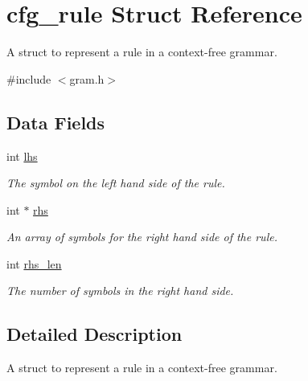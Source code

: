 \hypertarget{structcfg__rule}{\section{cfg\-\_\-rule \-Struct \-Reference}
\label{structcfg__rule}
}


\-A struct to represent a rule in a context-\/free grammar.  




{\ttfamily \#include $<$gram.\-h$>$}

\subsection*{\-Data \-Fields}
\begin{DoxyCompactItemize}
\item 
\hypertarget{structcfg__rule_ad79dfb552ae253049535ec9313589411}{int \hyperlink{structcfg__rule_ad79dfb552ae253049535ec9313589411}{lhs}}\label{structcfg__rule_ad79dfb552ae253049535ec9313589411}

\begin{DoxyCompactList}\small\item\em \-The symbol on the left hand side of the rule. \end{DoxyCompactList}\item 
\hypertarget{structcfg__rule_aa5629183aa50f5a8cb0aaa8896b7e37c}{int $\ast$ \hyperlink{structcfg__rule_aa5629183aa50f5a8cb0aaa8896b7e37c}{rhs}}\label{structcfg__rule_aa5629183aa50f5a8cb0aaa8896b7e37c}

\begin{DoxyCompactList}\small\item\em \-An array of symbols for the right hand side of the rule. \end{DoxyCompactList}\item 
\hypertarget{structcfg__rule_a9c44d66a9b3bbe2357e78def1286d000}{int \hyperlink{structcfg__rule_a9c44d66a9b3bbe2357e78def1286d000}{rhs\-\_\-len}}\label{structcfg__rule_a9c44d66a9b3bbe2357e78def1286d000}

\begin{DoxyCompactList}\small\item\em \-The number of symbols in the right hand side. \end{DoxyCompactList}\end{DoxyCompactItemize}


\subsection{\-Detailed \-Description}
\-A struct to represent a rule in a context-\/free grammar. 

